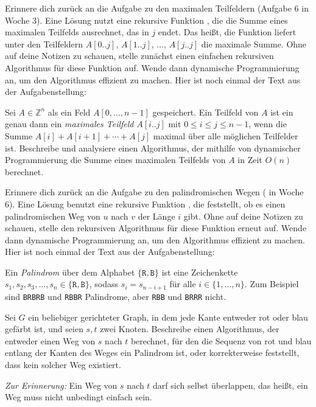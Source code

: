 \documentclass{uebung_cs}
\begin{document}
\begin{aufgabe}
    Erinnere dich zurück an die Aufgabe zu den maximalen Teilfeldern (Aufgabe 6 in Woche 3).
    Eine Lösung nutzt eine rekursive Funktion
    , die die Summe eines maximalen Teilfelds ausrechnet, das in $j$ endet. Das heißt, die Funktion liefert unter den Teilfeldern $A[0..j]$, $A[1..j]$, $\dots$, $A[j..j]$ die maximale Summe.
    Ohne auf deine Notizen zu schauen, stelle zunächst einen einfachen rekursiven Algorithmus für diese Funktion auf. Wende dann dynamische Programmierung an, um den Algorithmus effizient zu machen. Hier ist noch einmal der Text aus der Aufgabenstellung:

    Sei $A \in \mathbb{Z}^n$ als ein Feld $A[0, \dots, n-1]$ gespeichert.
	Ein Teilfeld von $A$ ist ein genau dann ein \textit{maximales Teilfeld} $A[i..j]$ mit $0\leq i\leq j\leq n-1$, wenn die Summe $A[i] + A[i+1] + \cdots + A[j]$ maximal über alle möglichen Teilfelder ist.
    Beschreibe und analysiere einen Algorithmus, der mithilfe von dynamischer Programmierung die Summe eines maximalen Teilfelds von $A$ in Zeit $O(n)$ berechnet.
\end{aufgabe}

\begin{aufgabe}
    Erinnere dich zurück an die Aufgabe zu den palindromischen Wegen ( in Woche 6).
    Eine Lösung benutzt eine rekursive Funktion , die feststellt, ob es einen palindromischen Weg von $u$ nach $v$ der Länge $i$ gibt.
    Ohne auf deine Notizen zu schauen, stelle den rekursiven Algorithmus für diese Funktion erneut auf. Wende dann dynamische Programmierung an, um den Algorithmus effizient zu machen. Hier ist noch einmal der Text aus der Aufgabenstellung:

    Ein \emph{Palindrom} über dem Alphabet $\{\texttt{R},\texttt{B}\}$ ist eine Zeichenkette $s_1,s_2,s_3,\dots,s_n\in\{\texttt{R},\texttt{B}\}$, sodass $s_i=s_{n-i+1}$ für alle $i\in\{1,\dots,n\}$. Zum Beispiel sind \texttt{BRBRB} und \texttt{RBBR} Palindrome, aber \texttt{RBB} und \texttt{BRRR} nicht.

Sei $G$ ein beliebiger gerichteter Graph, in dem jede Kante entweder rot oder blau gefärbt ist, und seien $s,t$ zwei Knoten.
Beschreibe einen Algorithmus, der entweder einen Weg von $s$ nach $t$ berechnet, für den die Sequenz von rot und blau entlang der Kanten des Weges ein Palindrom ist, oder korrekterweise feststellt, dass kein solcher Weg existiert.

\emph{Zur Erinnerung:} Ein Weg von $s$ nach $t$ darf sich selbst überlappen, das heißt, ein Weg muss nicht unbedingt einfach sein.
\end{aufgabe}
\end{document}
